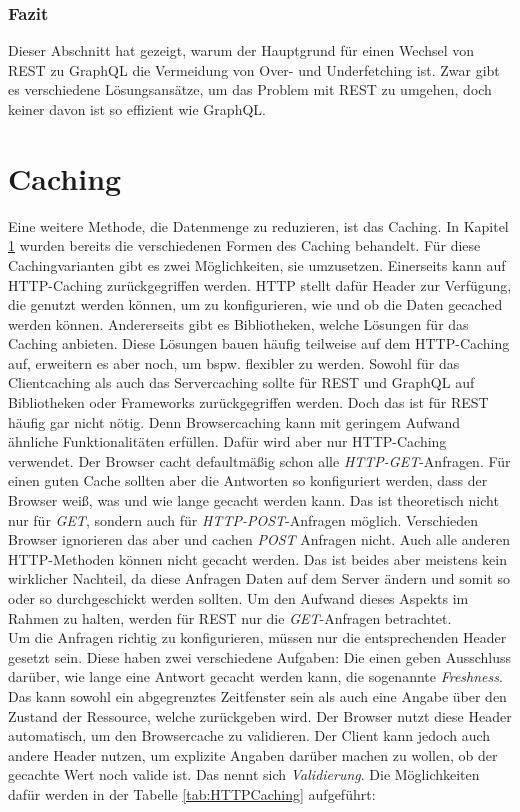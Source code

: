\subsubsection{Fazit}

Dieser Abschnitt hat gezeigt, warum der Hauptgrund für einen Wechsel von \ac{REST} zu GraphQL die Vermeidung von Over- und Underfetching ist. Zwar gibt es verschiedene Lösungsansätze, um das Problem mit \ac{REST} zu umgehen, doch keiner davon ist so effizient wie GraphQL.

\section{Caching}\label{caching}

Eine weitere Methode, die Datenmenge zu reduzieren, ist das Caching. In Kapitel \ref{caching} wurden bereits die verschiedenen Formen des Caching behandelt. Für diese Cachingvarianten gibt es zwei Möglichkeiten, sie umzusetzen. Einerseits kann auf HTTP-Caching zurückgegriffen werden. \ac{HTTP} stellt dafür Header zur Verfügung, die genutzt werden können, um zu konfigurieren, wie und ob die Daten gecached werden können. Andererseits gibt es Bibliotheken, welche Lösungen für das Caching anbieten. Diese Lösungen bauen häufig teilweise auf dem HTTP-Caching auf, erweitern es aber noch, um bspw. flexibler zu werden. Sowohl für das Clientcaching als auch das Servercaching sollte für \ac{REST} und GraphQL auf Bibliotheken oder Frameworks zurückgegriffen werden. Doch das ist für \ac{REST} häufig gar nicht nötig. Denn Browsercaching kann mit  geringem Aufwand ähnliche Funktionalitäten erfüllen. Dafür wird aber nur HTTP-Caching verwendet. Der Browser cacht defaultmäßig schon alle \textit{HTTP-GET}-Anfragen. Für einen guten Cache sollten aber die Antworten so konfiguriert werden, dass der Browser weiß, was und wie lange gecacht werden kann. Das ist theoretisch nicht nur für \textit{GET}, sondern auch für \textit{HTTP-POST}-Anfragen möglich. Verschieden Browser ignorieren das aber und cachen \textit{POST} Anfragen nicht. Auch alle anderen HTTP-Methoden können nicht gecacht werden. Das ist beides aber meistens kein wirklicher Nachteil, da diese Anfragen Daten auf dem Server ändern und somit so oder so durchgeschickt werden sollten. Um den Aufwand dieses Aspekts im Rahmen zu halten, werden für \ac{REST} nur die \textit{GET}-Anfragen betrachtet.\\
Um die Anfragen richtig zu konfigurieren, müssen nur die entsprechenden Header gesetzt sein. Diese haben zwei verschiedene Aufgaben: Die einen geben Ausschluss darüber, wie lange eine Antwort gecacht werden kann, die sogenannte \textit{Freshness}. Das kann sowohl ein abgegrenztes Zeitfenster sein als auch eine Angabe über den Zustand der Ressource, welche zurückgeben wird. Der Browser nutzt diese Header automatisch, um den Browsercache zu validieren. Der Client kann jedoch auch andere Header nutzen, um explizite Angaben darüber machen zu wollen, ob der gecachte Wert noch valide ist. Das nennt sich \textit{Validierung}. Die Möglichkeiten dafür werden in der Tabelle \ref{tab:HTTPCaching} aufgeführt:

